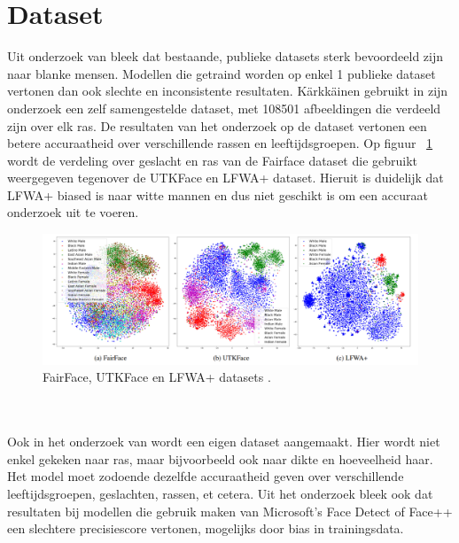 \section{Dataset} \label{sec:dataset}
Uit onderzoek van \textcite{Karkkainen2021} bleek dat bestaande, publieke datasets sterk bevoordeeld zijn naar blanke mensen. Modellen die getraind worden op enkel 1 publieke dataset vertonen dan ook slechte en inconsistente resultaten. Kärkkäinen gebruikt in zijn onderzoek een zelf samengestelde dataset, met 108501 afbeeldingen die verdeeld zijn over elk ras. De resultaten van het onderzoek op de dataset vertonen een betere accuraatheid over verschillende rassen en leeftijdsgroepen. Op figuur {~\ref{fig:datasets}} wordt de verdeling over geslacht en ras van de Fairface dataset die \textcite{Karkkainen2021} gebruikt weergegeven tegenover de UTKFace en LFWA+ dataset. Hieruit is duidelijk dat LFWA+ biased is naar witte mannen en dus niet geschikt is om een accuraat onderzoek uit te voeren. 
\begin{figure}
    \centering
    \includegraphics[width=\columnwidth]{graphics/datasets.png}
    \caption[FairFace, UTKFace en LFWA+ datasets]{ FairFace, UTKFace en LFWA+ datasets \autocite{Karkkainen2021}.
        \label{fig:datasets}}
\end{figure}\\
\\
Ook in het onderzoek van \textcite{Buolamwini2018} wordt een eigen dataset aangemaakt. Hier wordt niet enkel gekeken naar ras, maar bijvoorbeeld ook naar dikte en hoeveelheid haar. Het model moet zodoende dezelfde accuraatheid geven over verschillende leeftijdsgroepen, geslachten, rassen, et cetera. Uit het onderzoek bleek ook dat resultaten bij modellen die gebruik maken van Microsoft's Face Detect of Face++ een slechtere precisiescore vertonen, mogelijks door bias in trainingsdata. 
 


